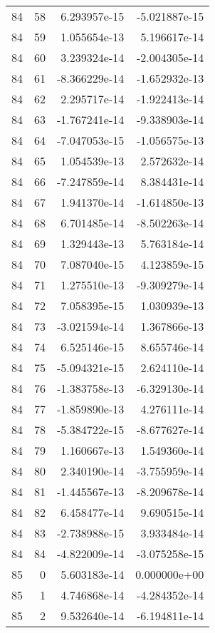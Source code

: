 \begin{tabular}{rrrr}
  84 &   58 &  6.293957e-15 & -5.021887e-15 \\
  84 &   59 &  1.055654e-13 &  5.196617e-14 \\
  84 &   60 &  3.239324e-14 & -2.004305e-14 \\
  84 &   61 & -8.366229e-14 & -1.652932e-13 \\
  84 &   62 &  2.295717e-14 & -1.922413e-14 \\
  84 &   63 & -1.767241e-14 & -9.338903e-14 \\
  84 &   64 & -7.047053e-15 & -1.056575e-13 \\
  84 &   65 &  1.054539e-13 &  2.572632e-14 \\
  84 &   66 & -7.247859e-14 &  8.384431e-14 \\
  84 &   67 &  1.941370e-14 & -1.614850e-13 \\
  84 &   68 &  6.701485e-14 & -8.502263e-14 \\
  84 &   69 &  1.329443e-13 &  5.763184e-14 \\
  84 &   70 &  7.087040e-15 &  4.123859e-15 \\
  84 &   71 &  1.275510e-13 & -9.309279e-14 \\
  84 &   72 &  7.058395e-15 &  1.030939e-13 \\
  84 &   73 & -3.021594e-14 &  1.367866e-13 \\
  84 &   74 &  6.525146e-15 &  8.655746e-14 \\
  84 &   75 & -5.094321e-15 &  2.624110e-14 \\
  84 &   76 & -1.383758e-13 & -6.329130e-14 \\
  84 &   77 & -1.859890e-13 &  4.276111e-14 \\
  84 &   78 & -5.384722e-15 & -8.677627e-14 \\
  84 &   79 &  1.160667e-13 &  1.549360e-14 \\
  84 &   80 &  2.340190e-14 & -3.755959e-14 \\
  84 &   81 & -1.445567e-13 & -8.209678e-14 \\
  84 &   82 &  6.458477e-14 &  9.690515e-14 \\
  84 &   83 & -2.738988e-15 &  3.933484e-14 \\
  84 &   84 & -4.822009e-14 & -3.075258e-15 \\
  85 &    0 &  5.603183e-14 &  0.000000e+00 \\
  85 &    1 &  4.746868e-14 & -4.284352e-14 \\
  85 &    2 &  9.532640e-14 & -6.194811e-14 \\

\end{tabular}
